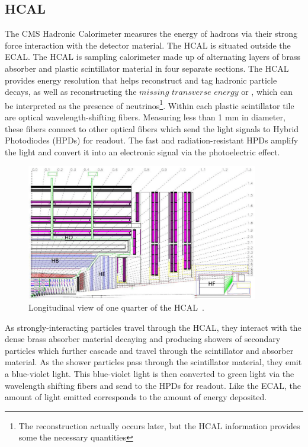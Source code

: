 \subsection{HCAL}
The CMS Hadronic Calorimeter measures the energy of hadrons via their strong force interaction with the detector material. The HCAL is situated outside the ECAL.
The HCAL is sampling calorimeter made up of alternating layers of brass absorber and plastic scintillator material in four separate sections. The HCAL provides energy resolution that helps reconstruct and tag hadronic
particle decays, as well as reconstructing the $missing$ $transverse$ $energy$ or \met, which can be interpreted as the presence of neutrinos\footnote{The \met reconstruction actually occurs later, but the HCAL information
provides some the necessary quantities}. Within each plastic scintillator tile are optical wavelength-shifting fibers.
Measuring less than 1 mm in diameter, these fibers connect to other optical fibers which send the light signals to Hybrid Photodiodes (HPDs) for readout. The fast and radiation-resistant HPDs amplify the light and convert it
into an electronic signal via the photoelectric effect.

\begin{figure}[hbtp]
 \begin{center}
   \includegraphics[width=0.9\textwidth]{ch3_figs/hcal.pdf}
   \caption[Longitudinal view of the CMS HCAL]{Longitudinal view of one quarter of the HCAL~\cite{cms_bluebook}.}
   \label{fig:cms_hcal}
 \end{center}
\end{figure}

As strongly-interacting particles travel through the HCAL, they interact with the dense brass absorber material decaying and producing showers of secondary particles which further cascade and travel through the scintillator and absorber material.
As the shower particles pass through the scintillator material, they emit a blue-violet light. This blue-violet light is then converted to green light via the wavelength shifting fibers and send to the HPDs for readout. Like the ECAL,
the amount of light emitted corresponds to the amount of energy deposited. 

